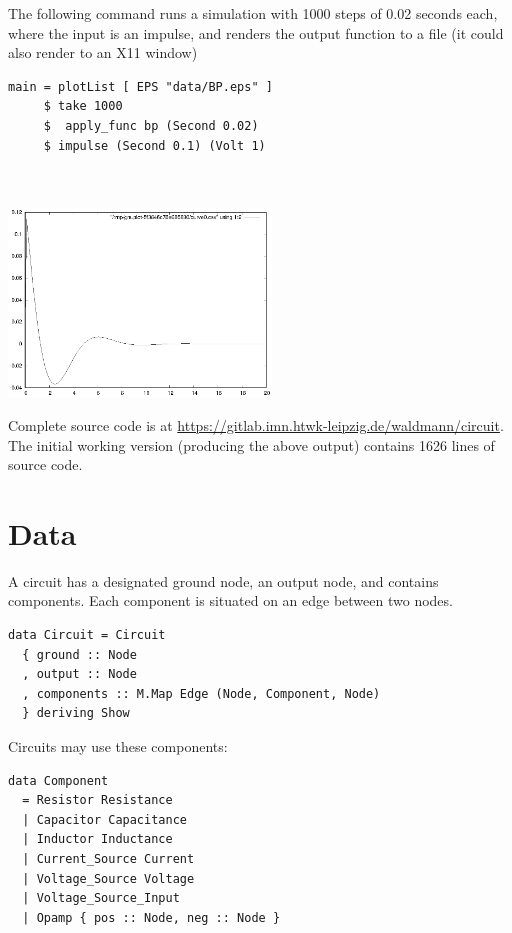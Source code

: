 \documentclass{article}
\begin{document}
The following command runs a simulation with 1000 steps of 0.02 seconds each,
where the input is an impulse, and renders the output function to a file
(it could also render to an X11 window)

\begin{minipage}[b]{0.5\linewidth}
\begin{verbatim}
main = plotList [ EPS "data/BP.eps" ] 
     $ take 1000 
     $  apply_func bp (Second 0.02) 
     $ impulse (Second 0.1) (Volt 1)



\end{verbatim}
  \end{minipage}
\begin{minipage}[b]{0.5\linewidth}
\includegraphics[height=5cm]{BP}
\end{minipage}

Complete source code is at
\url{https://gitlab.imn.htwk-leipzig.de/waldmann/circuit}.
The initial working version (producing the above output) 
contains 1626 lines of source code.

\section{Data}

A circuit has a designated ground node, an output node,
and contains components. Each component is situated on an edge between two nodes.
\begin{verbatim}
data Circuit = Circuit
  { ground :: Node
  , output :: Node
  , components :: M.Map Edge (Node, Component, Node)
  } deriving Show
\end{verbatim}

Circuits may use these components:
\begin{verbatim}
data Component
  = Resistor Resistance
  | Capacitor Capacitance
  | Inductor Inductance
  | Current_Source Current
  | Voltage_Source Voltage
  | Voltage_Source_Input
  | Opamp { pos :: Node, neg :: Node }
\end{verbatim}
\end{document}
